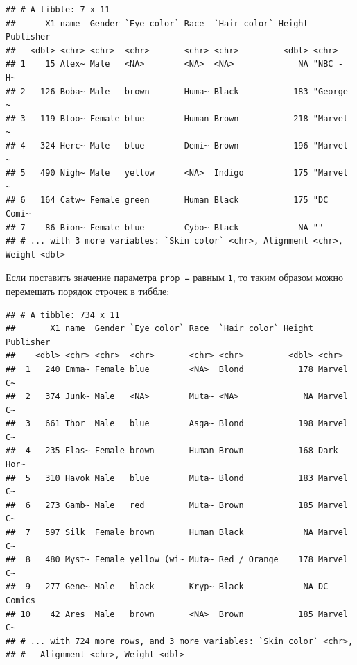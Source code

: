 \documentclass[
]{book}
\newenvironment{Shaded}{\begin{snugshade}}{\end{snugshade}}
\newcommand{\DataTypeTok}[1]{\textcolor[rgb]{0.13,0.29,0.53}{#1}}
\newcommand{\DecValTok}[1]{\textcolor[rgb]{0.00,0.00,0.81}{#1}}
\newcommand{\KeywordTok}[1]{\textcolor[rgb]{0.13,0.29,0.53}{\textbf{#1}}}
\newcommand{\NormalTok}[1]{#1}
\newcommand{\OperatorTok}[1]{\textcolor[rgb]{0.81,0.36,0.00}{\textbf{#1}}}
\newcommand{\StringTok}[1]{\textcolor[rgb]{0.31,0.60,0.02}{#1}}
\begin{document}
\begin{verbatim}
## # A tibble: 7 x 11
##      X1 name  Gender `Eye color` Race  `Hair color` Height Publisher
##   <dbl> <chr> <chr>  <chr>       <chr> <chr>         <dbl> <chr>    
## 1    15 Alex~ Male   <NA>        <NA>  <NA>             NA "NBC - H~
## 2   126 Boba~ Male   brown       Huma~ Black           183 "George ~
## 3   119 Bloo~ Female blue        Human Brown           218 "Marvel ~
## 4   324 Herc~ Male   blue        Demi~ Brown           196 "Marvel ~
## 5   490 Nigh~ Male   yellow      <NA>  Indigo          175 "Marvel ~
## 6   164 Catw~ Female green       Human Black           175 "DC Comi~
## 7    86 Bion~ Female blue        Cybo~ Black            NA ""       
## # ... with 3 more variables: `Skin color` <chr>, Alignment <chr>, Weight <dbl>
\end{verbatim}

Если поставить значение параметра \texttt{prop\ =} равным \texttt{1}, то таким образом можно перемешать порядок строчек в тиббле:

\begin{Shaded}
\end{Shaded}

\begin{verbatim}
## # A tibble: 734 x 11
##       X1 name  Gender `Eye color` Race  `Hair color` Height Publisher
##    <dbl> <chr> <chr>  <chr>       <chr> <chr>         <dbl> <chr>    
##  1   240 Emma~ Female blue        <NA>  Blond           178 Marvel C~
##  2   374 Junk~ Male   <NA>        Muta~ <NA>             NA Marvel C~
##  3   661 Thor  Male   blue        Asga~ Blond           198 Marvel C~
##  4   235 Elas~ Female brown       Human Brown           168 Dark Hor~
##  5   310 Havok Male   blue        Muta~ Blond           183 Marvel C~
##  6   273 Gamb~ Male   red         Muta~ Brown           185 Marvel C~
##  7   597 Silk  Female brown       Human Black            NA Marvel C~
##  8   480 Myst~ Female yellow (wi~ Muta~ Red / Orange    178 Marvel C~
##  9   277 Gene~ Male   black       Kryp~ Black            NA DC Comics
## 10    42 Ares  Male   brown       <NA>  Brown           185 Marvel C~
## # ... with 724 more rows, and 3 more variables: `Skin color` <chr>,
## #   Alignment <chr>, Weight <dbl>
\end{verbatim}
\end{document}

